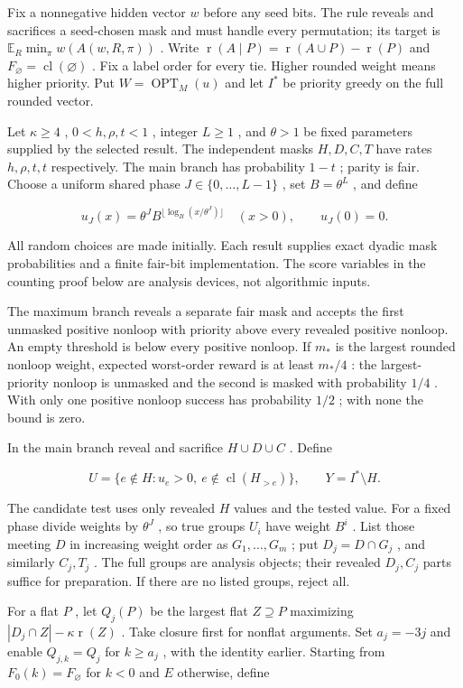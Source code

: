 \documentclass[11pt]{article}
\begin{document}
Fix a nonnegative hidden vector \(w\) before any seed bits. The rule reveals and sacrifices a seed-chosen mask and must handle every permutation; its target is \(\mathbb{E}_R\min_\pi w(A(w,R,\pi))\) . Write \(\operatorname{r}(A\mid P)=\operatorname{r}(A\cup P)-\operatorname{r}(P)\) and \(F_{\varnothing}=\operatorname{cl}(\varnothing)\) . Fix a label order for every tie. Higher rounded weight means higher priority. Put \(W=\operatorname{OPT}_M(u)\) and let \(I^*\) be priority greedy on the full rounded vector.

Let \(\kappa\ge4\) , \(0<h,\rho,t<1\) , integer \(L\ge1\) , and \(\theta>1\) be fixed parameters supplied by the selected result. The independent masks \(H,D,C,T\) have rates \(h,\rho,t,t\) respectively. The main branch has probability \(1-t\) ; parity is fair. Choose a uniform shared phase \(J\in\{0,\ldots,L-1\}\) , set \(B=\theta^L\) , and define

\[u_J(x)=\theta^J B^{\lfloor\log_B(x/\theta^J)\rfloor}\quad(x>0),\qquad u_J(0)=0.\]

All random choices are made initially. Each result supplies exact dyadic mask probabilities and a finite fair-bit implementation. The score variables in the counting proof below are analysis devices, not algorithmic inputs.

The maximum branch reveals a separate fair mask and accepts the first unmasked positive nonloop with priority above every revealed positive nonloop. An empty threshold is below every positive nonloop. If \(m_*\) is the largest rounded nonloop weight, expected worst-order reward is at least \(m_*/4\) : the largest-priority nonloop is unmasked and the second is masked with probability \(1/4\) . With only one positive nonloop success has probability \(1/2\) ; with none the bound is zero.

In the main branch reveal and sacrifice \(H\cup D\cup C\) . Define

\[U=\{e\notin H:u_e>0,\ e\notin\operatorname{cl}(H_{>e})\},\qquad Y=I^*\setminus H.\]

The candidate test uses only revealed \(H\) values and the tested value. For a fixed phase divide weights by \(\theta^J\) , so true groups \(U_i\) have weight \(B^i\) . List those meeting \(D\) in increasing weight order as \(G_1,\ldots,G_m\) ; put \(D_j=D\cap G_j\) , and similarly \(C_j,T_j\) . The full groups are analysis objects; their revealed \(D_j,C_j\) parts suffice for preparation. If there are no listed groups, reject all.

For a flat \(P\) , let \(Q_j(P)\) be the largest flat \(Z\supseteq P\) maximizing \(|D_j\cap Z|-\kappa\operatorname{r}(Z)\) . Take closure first for nonflat arguments. Set \(a_j=-3j\) and enable \(Q_{j,k}=Q_j\) for \(k\ge a_j\) , with the identity earlier. Starting from \(F_0(k)=F_{\varnothing}\) for \(k<0\) and \(E\) otherwise, define
\end{document}
